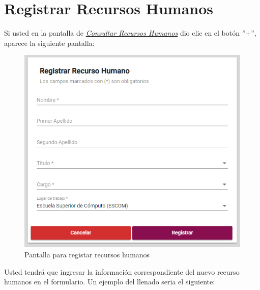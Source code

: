             
        

    \newpage
        \hypertarget{registrarRH}{}
        \section{Registrar Recursos Humanos} 
            Si usted  en la pantalla de \hyperlink{consultarRH}{\textit{Consultar Recursos Humanos}} dio clic en el botón ''+'', aparece la siguiente pantalla:
            
            \begin{figure}[!hbtp]
                \centering
                \hypertarget{registrarUs}{\includegraphics[width=0.7\linewidth]{images/SP1/RegistrarRH}}
                \caption{Pantalla para registar recursos humanos}
                \label{registrarrh}
            \end{figure}
            
            Usted tendrá que ingresar la información correspondiente del nuevo recurso humanos en el formulario. Un ejemplo del llenado seria el siguiente:
        
